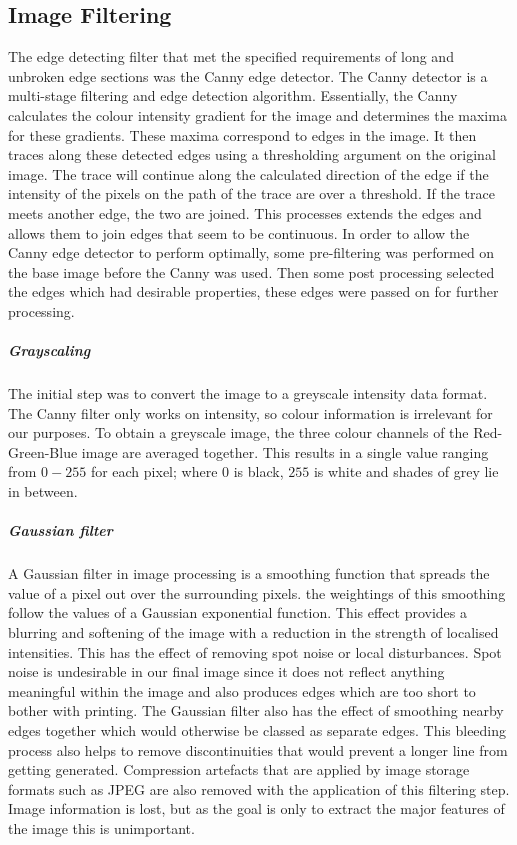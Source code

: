 \subsection{Image Filtering}
The edge detecting filter that met the specified requirements of long and unbroken edge sections was the Canny edge detector. The Canny detector is a multi-stage filtering and edge detection algorithm. Essentially, the Canny calculates the colour intensity gradient for the image and determines the maxima for these gradients. These maxima correspond to edges in the image. It then traces along these detected edges using a thresholding argument on the original image. The trace will continue along the calculated direction of the edge if the intensity of the pixels on the path of the trace are over a threshold. If the trace meets another edge, the two are joined. This processes extends the edges and allows them to join edges that seem to be continuous.
In order to allow the Canny edge detector to perform optimally, some pre-filtering was performed on the base image before the Canny was used. Then some post processing selected the edges which had desirable properties, these edges were passed on for further processing.
\subparagraph{Grayscaling}
The initial step was to convert the image to a greyscale intensity data format. The Canny filter only works on intensity, so colour information is irrelevant for our purposes. To obtain a greyscale image, the three colour channels of the Red-Green-Blue image are averaged together. This results in a single value ranging from $0-255$ for each pixel; where $0$ is black, $255$ is white and shades of grey lie in between.
\subparagraph{Gaussian filter}
A Gaussian filter in image processing is a smoothing function that spreads the value of a pixel out over the surrounding pixels. the weightings of this smoothing follow the values of a Gaussian exponential function. This effect provides a blurring and softening of the image with a reduction in the strength of localised intensities. This has the effect of removing spot noise or local disturbances. Spot noise is undesirable in our final image since it does not reflect anything meaningful within the image and also produces edges which are too short to bother with printing. The Gaussian filter also has the effect of smoothing nearby edges together which would otherwise be classed as separate edges. This bleeding process also helps to remove discontinuities that would prevent a longer line from getting generated. Compression artefacts that are applied by image storage formats such as JPEG are also removed with the application of this filtering step. Image information is lost, but as the goal is only to extract the major features of the image this is unimportant.
